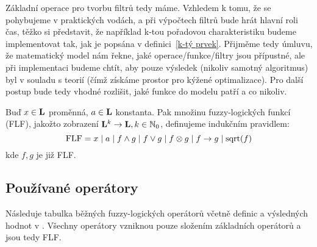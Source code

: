     Základní operace pro tvorbu filtrů tedy máme. Vzhledem k tomu, že se pohybujeme v praktických vodách, a při výpočtech filtrů bude hrát hlavní roli čas, těžko si představit, že například k-tou pořadovou charakteristiku budeme implementovat tak, jak je popsána v definici~\ref{k-tý prvek}. Přijměme tedy úmluvu, že matematický model nám řekne, jaké operace/funkce/filtry jsou přípustné, ale při implementaci budeme chtít, aby pouze výsledek (nikoliv samotný algoritmus) byl v souladu s teorií (čímž získáme prostor pro kýžené optimalizace). Pro další postup bude tedy vhodné rozlišit, jaké funkce do modelu patří a co nikoliv.
    
    \begin{define}\label{FLF}
    Buď $x \in \mathbf{L}$ proměnná, $a \in \mathbf{L}$ konstanta. Pak množinu fuzzy-logických funkcí \textup{(FLF)}, jakožto zobrazení $\mathbf{L}^k \rightarrow \mathbf{L}, k \in \mathbb{N}_0$, definujeme indukčním pravidlem:
    \[
    \mathrm{FLF} = x \mid a \mid f \wedge g \mid f \vee g \mid f \otimes g \mid f \rightarrow g \mid \mathrm{sqrt}(f) 
    \]
    kde $f,g$ je již \textup{FLF}.
    \end{define}
    
    \subsection{Používané operátory}\label{operátory}
    
    Následuje tabulka běžných fuzzy-logických operátorů včetně definic a výsledných hodnot v \LAsq. Všechny operátory vzniknou pouze složením základních operátorů a jsou tedy FLF.
    
